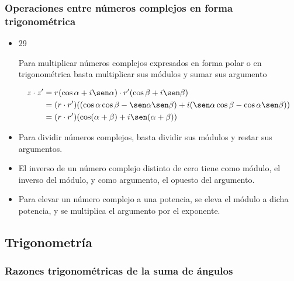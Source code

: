 \documentclass[11pt]{article}
\begin{document}
\subsubsection{Operaciones entre números complejos en forma trigonométrica}
\label{sec:org029e8f9}

\begin{itemize}
\item 29
\begin{teorema}
Para multiplicar números complejos expresados en forma polar o en
trigonométrica basta multiplicar sus módulos y sumar sus argumento
\end{teorema}
\begin{demostracion}
\begin{align*}
z_{} \cdot z' &= r_{}(\cos \alpha + i\sen \alpha) \cdot r'(\cos \beta + i \sen \beta)  \\
       &= (r \cdot r') ((\cos \alpha \cos \beta - \sen \alpha \sen \beta) + i (\sen \alpha \cos \beta - \cos \alpha \sen \beta))   \\
       &= (r \cdot r') (\cos (\alpha + \beta) + i \sen (\alpha + \beta))  \\
\end{align*}
\end{demostracion}

\item Para dividir números complejos, basta dividir sus módulos y restar
sus argumentos.

\item El inverso de un número complejo distinto de cero tiene como módulo,
el inverso del módulo, y como argumento, el opuesto del argumento.

\item Para elevar un número complejo a una potencia, se eleva el módulo a
dicha potencia, y se multiplica el argumento por el exponente.
\end{itemize}

\subsection{Trigonometría}
\label{sec:org2cec6d5}

\subsubsection{Razones trigonométricas de la suma de ángulos}
\label{sec:orgcd5c4a4}
\end{document}
